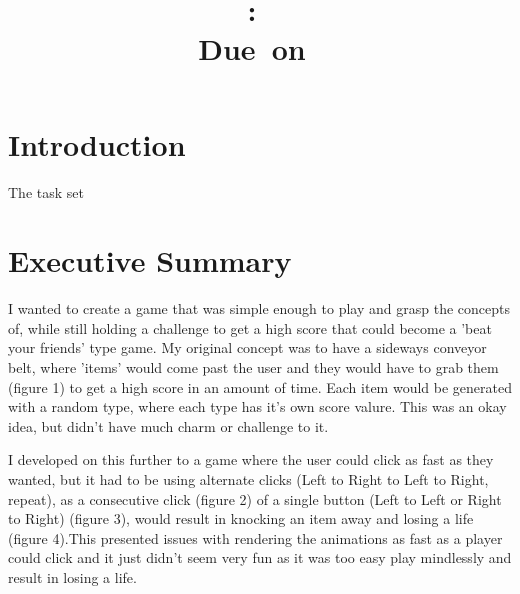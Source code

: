\documentclass{article}
\title{
\vspace{2in}
\textmd{\textbf{\hmwkClass:\ \hmwkTitle}}\\
\normalsize\vspace{0.1in}\small{Due\ on\ \hmwkDueDate}\\
\vspace{3in}
}
\author{\textbf{\hmwkAuthorName}}
\date{} %
\begin{document}
\maketitle



\newpage
\tableofcontents
\newpage



\section{Introduction}
The task set\cite{assignment}



\section{Executive Summary}
I wanted to create a game that was simple enough to play and grasp the concepts of, while still holding a challenge to get a high score that could become a 'beat your friends' type game. My original concept was to have a sideways conveyor belt, where 'items' would come past the user and they would have to grab them (figure 1) to get a high score in an amount of time. Each item would be generated with a random type, where each type has it's own score valure. This was an okay idea, but didn't have much charm or challenge to it. 

I developed on this further to a game where the user could click as fast as they wanted, but it had to be using alternate clicks (Left to Right to Left to Right, repeat), as a consecutive click (figure 2) of a single button (Left to Left or Right to Right) (figure 3), would result in knocking an item away and losing a life (figure 4).This presented issues with rendering the animations as fast as a player could click and it just didn't seem very fun as it was too easy play mindlessly and result in losing a life.
\end{document}
